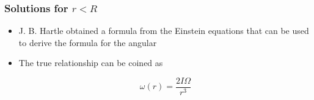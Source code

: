 \begin{frame}
\frametitle{Solutions for $r < R$}

\begin{itemize}
	\item J. B. Hartle obtained a formula from the Einstein equations that can be used to derive the formula for the angular 
	
	\item The true relationship can be coined as
	\begin{block}{}
		\begin{equation}
			\omega (r)
			=
			\frac{2 I \Omega}{r^{3}}
		\end{equation}
	\end{block}
\end{itemize}

\end{frame}
